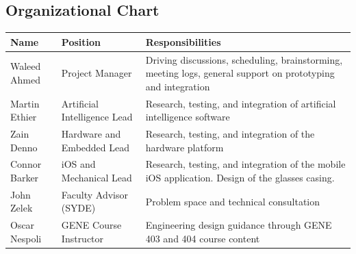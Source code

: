 \documentclass[a4paper,11pt]{article}
\begin{document}
\newpage

\subsection{Organizational Chart}
\begin{table}[ht]
    \centering
    \begin{tabular}{|p{2.8cm}|p{5.5cm}|p{6.5cm}|}
        \hline
        Name & Position & Responsibilities \\ \hline
        Waleed Ahmed & Project Manager & Driving discussions, scheduling, brainstorming, meeting logs, general support on prototyping and integration
        \\ \hline
        
        Martin Ethier & Artificial Intelligence Lead & 
        Research, testing, and integration of artificial intelligence software
        \\ \hline
        
        Zain Denno & Hardware and Embedded Lead & 
        Research, testing, and integration of the hardware platform \\ \hline
        
        Connor Barker & iOS and Mechanical Lead & 
        Research, testing, and integration of the mobile iOS application. Design of the glasses casing. \\ \hline
        
        John Zelek & Faculty Advisor (SYDE) & Problem space and technical consultation \\ \hline
        
        Oscar Nespoli & GENE Course Instructor & Engineering design guidance through GENE 403 and 404 course content \\ \hline
    \end{tabular}
\end{table}
\end{document}
